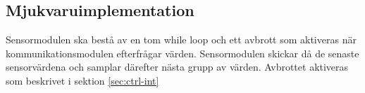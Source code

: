 \documentclass[designspec/spec.tex]{subfiles}
\begin{document}
\subsection{Mjukvaruimplementation} 
Sensormodulen ska bestå av en tom while loop och ett avbrott som aktiveras när
kommunikationsmodulen efterfrågar värden. Sensormodulen skickar då de senaste
sensorvärdena och samplar därefter nästa grupp av värden. Avbrottet aktiveras
som beskrivet i sektion \ref{sec:ctrl-int}
\end{document}
